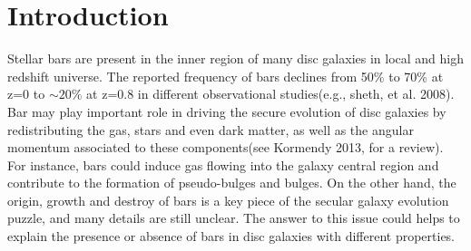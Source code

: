 

\section{Introduction} \label{sec:intro}
Stellar bars are present in the inner region of many disc galaxies in local and high redshift universe. The reported frequency of bars declines from 50\% to 70\% at z=0 to $\sim 20\%$ at z=0.8 in different observational studies(e.g., sheth, et al. 2008). Bar may play important role in driving the secure evolution of disc galaxies by redistributing the gas, stars and even dark matter, as well as the angular momentum associated to these components(see Kormendy 2013, for a review). For instance, bars could induce gas flowing into the galaxy central region and contribute to the formation of pseudo-bulges and bulges. On the other hand, the origin, growth and destroy of bars is a key piece of the secular galaxy evolution puzzle, and many details are still unclear. The answer to this issue could helps to explain the presence or absence of bars in disc galaxies with different properties. 

